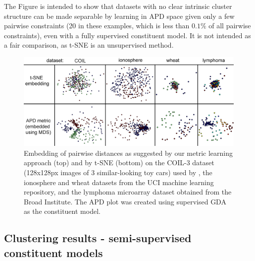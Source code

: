 \documentclass[12pt,PhD,twoside]{muthesis}
\begin{document}
The Figure is intended to show that datasets with no clear intrinsic cluster structure can be made separable by learning in APD space given only a few pairwise constraints (20 in these examples, which is less than $0.1 \%$ of all pairwise constraints), even with a fully supervised constituent model. It is not intended as a fair comparison, as t-SNE is an unsupervised method.

\begin{figure}[t]
	\centering
	
	\includegraphics[width=\textwidth]{embeddingresults}%
	
	\caption[Embedding of pairwise distances as suggested by our metric learning approach]{Embedding of pairwise distances as suggested by our metric learning approach (top) and by t-SNE (bottom) on the COIL-3 dataset (128x128px images of 3 similar-looking toy cars) used by \citep{zeng2012semi}, the ionosphere and wheat datasets from the UCI machine learning repository, and the lymphoma microarray dataset obtained from the Broad Institute. The APD plot was created using supervised GDA as the constituent model.}
	\label{embedding} 
\end{figure}


\subsection*{Clustering results - semi-supervised constituent models}
\end{document}
